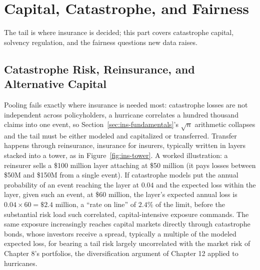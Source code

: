 \documentclass[../ai_in_finance]{subfiles}
\begin{document}
\section{Capital, Catastrophe, and Fairness}

The tail is where insurance is decided; this part covers catastrophe capital, solvency regulation, and the fairness questions new data raises.

\subsection{Catastrophe Risk, Reinsurance, and Alternative Capital}
\label{sec:ins-cat}

Pooling fails exactly where insurance is needed most: catastrophe losses are not independent across policyholders, a hurricane correlates a hundred thousand claims into one event, so Section~\ref{sec:ins-fundamentals}'s $\sqrt{n}$ arithmetic collapses and the tail must be either modeled and capitalized or transferred. Transfer happens through reinsurance, insurance for insurers, typically written in layers stacked into a tower, as in Figure~\ref{fig:ins-tower}. A worked illustration: a reinsurer sells a \$100 million layer attaching at \$50 million (it pays losses between \$50M and \$150M from a single event). If catastrophe models put the annual probability of an event reaching the layer at $0.04$ and the expected loss within the layer, given such an event, at \$60 million, the layer's expected annual loss is $0.04 \times 60 = \$2.4$ million, a ``rate on line'' of $2.4\%$ of the limit, before the substantial risk load such correlated, capital-intensive exposure commands. The same exposure increasingly reaches capital markets directly through catastrophe bonds, whose investors receive a spread, typically a multiple of the modeled expected loss, for bearing a tail risk largely uncorrelated with the market risk of Chapter 8's portfolios, the diversification argument of Chapter 12 applied to hurricanes.
\end{document}
